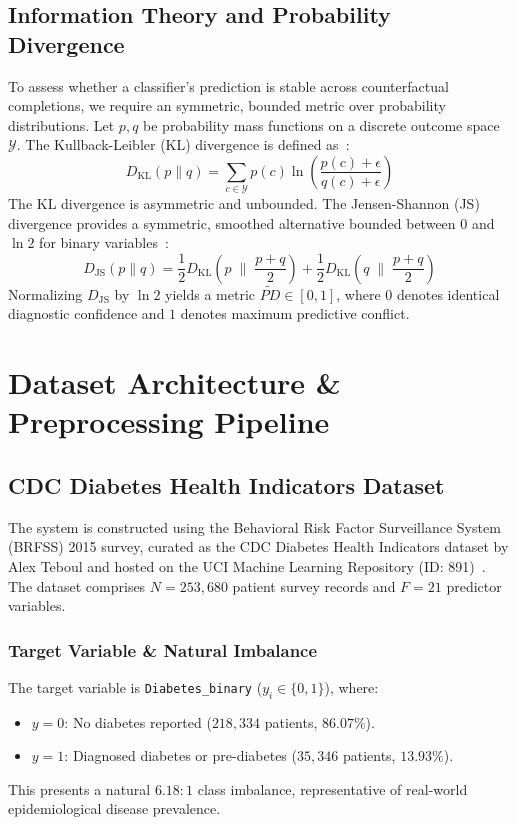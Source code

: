 \documentclass[11pt,a4paper]{report}
\begin{document}
\section{Information Theory and Probability Divergence}
To assess whether a classifier's prediction is stable across counterfactual completions, we require an symmetric, bounded metric over probability distributions. Let $p, q$ be probability mass functions on a discrete outcome space $\mathcal{Y}$. The Kullback-Leibler (KL) divergence is defined as~\cite{cover2006elements}:
\begin{equation}
  D_{\text{KL}}(p \parallel q) = \sum_{c \in \mathcal{Y}} p(c) \ln \left(\frac{p(c) + \epsilon}{q(c) + \epsilon}\right)
\end{equation}
The KL divergence is asymmetric and unbounded. The Jensen-Shannon (JS) divergence provides a symmetric, smoothed alternative bounded between $0$ and $\ln 2$ for binary variables~\cite{lin1991divergence}:
\begin{equation}
  D_{\text{JS}}(p \parallel q) = \frac{1}{2} D_{\text{KL}}\left(p \;\Big\|\; \frac{p + q}{2}\right) + \frac{1}{2} D_{\text{KL}}\left(q \;\Big\|\; \frac{p + q}{2}\right)
\end{equation}
Normalizing $D_{\text{JS}}$ by $\ln 2$ yields a metric $\widetilde{PD} \in [0, 1]$, where $0$ denotes identical diagnostic confidence and $1$ denotes maximum predictive conflict.

\chapter{Dataset Architecture \& Preprocessing Pipeline}

\section{CDC Diabetes Health Indicators Dataset}
The system is constructed using the Behavioral Risk Factor Surveillance System (BRFSS) 2015 survey, curated as the CDC Diabetes Health Indicators dataset by Alex Teboul and hosted on the UCI Machine Learning Repository (ID: 891)~\cite{teboul2021diabetes,cdc2015brfss}. The dataset comprises $N = 253,680$ patient survey records and $F = 21$ predictor variables.

\subsection{Target Variable \& Natural Imbalance}
The target variable is \texttt{Diabetes\_binary} ($y_i \in \{0, 1\}$), where:
\begin{itemize}[noitemsep]
  \item $y = 0$: No diabetes reported ($218,334$ patients, $86.07\%$).
  \item $y = 1$: Diagnosed diabetes or pre-diabetes ($35,346$ patients, $13.93\%$).
\end{itemize}
This presents a natural $6.18:1$ class imbalance, representative of real-world epidemiological disease prevalence.
\end{document}
